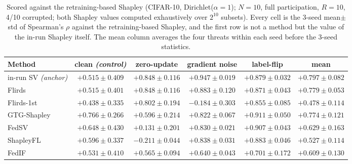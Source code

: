 \documentclass[letterpaper]{article} %
\theoremstyle{definition} %
\begin{document}
\begin{table}[t]
\centering
\small
\caption{Scored against the retraining-based Shapley (CIFAR-10,
Dirichlet($\alpha{=}1$); $N{=}10$, full participation, $R{=}10$, 4/10
corrupted; both Shapley values computed exhaustively over $2^{10}$ subsets).
Every cell is the 3-seed mean$\pm$std of Spearman's $\rho$ against the
retraining-based Shapley, and the first row is not a method but the value of
the in-run Shapley itself. The mean column averages the four threats within
each seed before the 3-seed statistics.}
\label{tab:retrain-fidelity}
\begin{tabular}{lccccc}
\hline
Method & clean \emph{(control)} & zero-update & gradient noise & label-flip & mean \\
\hline
in-run SV \emph{(anchor)} & $+0.515\pm0.409$ & $+0.848\pm0.116$ & $+0.947\pm0.019$ & $+0.879\pm0.032$ & $+0.797\pm0.082$ \\
Flirds & $+0.515\pm0.401$ & $+0.848\pm0.116$ & $+0.883\pm0.120$ & $+0.871\pm0.043$ & $+0.779\pm0.053$ \\
Flirds-1st & $+0.438\pm0.335$ & $+0.802\pm0.194$ & $-0.184\pm0.303$ & $+0.855\pm0.085$ & $+0.478\pm0.114$ \\
GTG-Shapley & $+0.766\pm0.266$ & $+0.596\pm0.214$ & $+0.822\pm0.067$ & $+0.911\pm0.050$ & $+0.774\pm0.121$ \\
FedSV & $+0.648\pm0.430$ & $+0.131\pm0.201$ & $+0.830\pm0.021$ & $+0.907\pm0.043$ & $+0.629\pm0.163$ \\
ShapleyFL & $+0.596\pm0.337$ & $-0.211\pm0.044$ & $+0.838\pm0.031$ & $+0.883\pm0.046$ & $+0.527\pm0.114$ \\
FedIF & $+0.531\pm0.410$ & $+0.565\pm0.094$ & $+0.640\pm0.043$ & $+0.701\pm0.172$ & $+0.609\pm0.130$ \\
\hline
\end{tabular}
\end{table}
\end{document}
